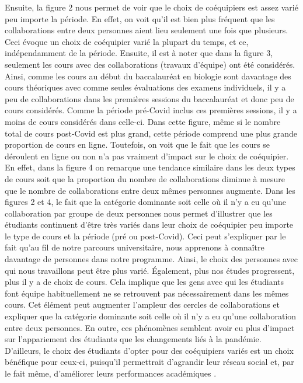 \documentclass{article}
\begin{document}
Ensuite, la figure 2 nous permet de voir que le choix de coéquipiers est assez varié peu importe la période. En effet, on voit qu'il est bien plus fréquent que les collaborations entre deux personnes aient lieu seulement une fois que plusieurs. Ceci évoque un choix de coéquipier varié la plupart du temps, et ce, indépendamment de la période. Ensuite, il est à noter que dans la figure 3, seulement les cours avec des collaborations (travaux d'équipe) ont été considérés. Ainsi, comme les cours au début du baccalauréat en biologie sont davantage des cours théoriques avec comme seules évaluations des examens individuels, il y a peu de collaborations dans les premières sessions du baccalauréat et donc peu de cours considérés. Comme la période pré-Covid inclus ces premières sessions, il y a moins de cours considérés dans celle-ci. Dans cette figure, même si le nombre total de cours post-Covid est plus grand, cette période comprend une plus grande proportion de cours en ligne. Toutefois, on voit que le fait que les cours se déroulent en ligne ou non n'a pas vraiment d'impact sur le choix de coéquipier. En effet, dans la figure 4 on remarque une tendance similaire dans les deux types de cours soit que la proportion du nombre de collaborations diminue à mesure que le nombre de collaborations entre deux mêmes personnes augmente. Dans les figures 2 et 4, le fait que la catégorie dominante soit celle où il n'y a eu qu'une collaboration par groupe de deux personnes nous permet d'illustrer que les étudiants continuent d'être très variés dans leur choix de coéquipier peu importe le type de cours et la période (pré ou post-Covid). Ceci peut s'expliquer par le fait qu'au fil de notre parcours universitaire, nous apprenons à connaître davantage de personnes dans notre programme. Ainsi, le choix des personnes avec qui nous travaillons peut être plus varié. Également, plus nos études progressent, plus il y a de choix de cours. Cela implique que les gens avec qui les étudiants font équipe habituellement ne se retrouvent pas nécessairement dans les mêmes cours. Cet élément peut augmenter l'ampleur des cercles de collaborations et expliquer que la catégorie dominante soit celle où il n'y a eu qu'une collaboration entre deux personnes. En outre, ces phénomènes semblent avoir eu plus d'impact sur l'appariement des étudiants que les changements liés à la pandémie. D'ailleurs, le choix des étudiants d'opter pour des coéquipiers variés est un choix bénéfique pour ceux-ci, puisqu'il permettrait d'agrandir leur réseau social et, par le fait même, d'améliorer leurs performances académiques \cite{rizzuto_its_nodate}.\\[\baselineskip]
\end{document}
